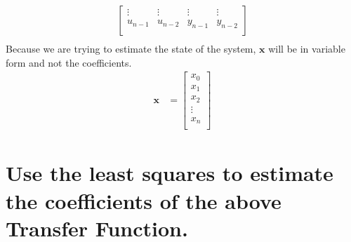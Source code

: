 \documentclass[12pt,letterpaper, onecolumn]{exam}
\begin{document}
\begin{questions}
\begin{parts}
{\begin{equation}
\begin{split}
\begin{bmatrix}
                        \vdots  & \vdots  & \vdots  & \vdots  \\
                        u_{n-1} & u_{n-2} & y_{n-1} & y_{n-2} \\
                    \end{bmatrix}\\
                \end{split}
                \label{eq:15}
            \end{equation}
            Because we are trying to estimate the state of the system, $\mathbf{x}$ will be in variable form and not the coefficients.
            \begin{equation}
                \begin{split}
                    \mathbf{x} & =
                    \begin{bmatrix}
                        x_0    \\
                        x_1    \\
                        x_2    \\
                        \vdots \\
                        x_n    \\
                    \end{bmatrix}
                \end{split}
                \label{eq:16}
            \end{equation}
        }

        \part{Use the least squares to estimate the coefficients of the above Transfer Function.}
        \begin{subparts}

            \solution{}


            \solution{}


            \solution{}


            \solution{}
        \end{subparts}



\end{parts}
\end{questions}
\end{document}
